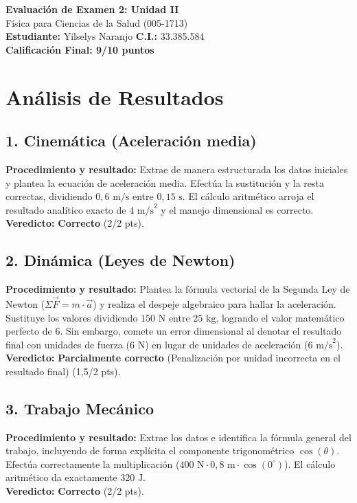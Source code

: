 \documentclass[12pt,letterpaper]{article}
\begin{document}
\begin{center}
    \Large \textbf{Evaluación de Examen 2: Unidad II} \\
    \large Física para Ciencias de la Salud (005-1713) \\
    \vspace{0.5cm}
    \textbf{Estudiante:} Yilselys Naranjo \quad \textbf{C.I.:} 33.385.584
    \vspace{0.3cm} \\
    \large \textbf{Calificación Final: 9/10 puntos}
\end{center}

\vspace{0.5cm}

\section*{Análisis de Resultados}

\subsection*{1. Cinemática (Aceleración media)}
\textbf{Procedimiento y resultado:} Extrae de manera estructurada los datos iniciales y plantea la ecuación de aceleración media. Efectúa la sustitución y la resta correctas, dividiendo $0,6 \text{ m/s}$ entre $0,15 \text{ s}$. El cálculo aritmético arroja el resultado analítico exacto de $4 \text{ m/s}^2$ y el manejo dimensional es correcto. \\
\textbf{Veredicto:} \textbf{Correcto} (2/2 pts).

\subsection*{2. Dinámica (Leyes de Newton)}
\textbf{Procedimiento y resultado:} Plantea la fórmula vectorial de la Segunda Ley de Newton ($\Sigma \vec{F} = m \cdot \vec{a}$) y realiza el despeje algebraico para hallar la aceleración. Sustituye los valores dividiendo $150 \text{ N}$ entre $25 \text{ kg}$, logrando el valor matemático perfecto de $6$. Sin embargo, comete un error dimensional al denotar el resultado final con unidades de fuerza ($6 \text{ N}$) en lugar de unidades de aceleración ($6 \text{ m/s}^2$). \\
\textbf{Veredicto:} \textbf{Parcialmente correcto} (Penalización por unidad incorrecta en el resultado final) (1,5/2 pts).

\subsection*{3. Trabajo Mecánico}
\textbf{Procedimiento y resultado:} Extrae los datos e identifica la fórmula general del trabajo, incluyendo de forma explícita el componente trigonométrico $\cos(\theta)$. Efectúa correctamente la multiplicación ($400 \text{ N} \cdot 0,8 \text{ m} \cdot \cos(0^\circ)$). El cálculo aritmético da exactamente $320 \text{ J}$. \\
\textbf{Veredicto:} \textbf{Correcto} (2/2 pts).
\end{document}
